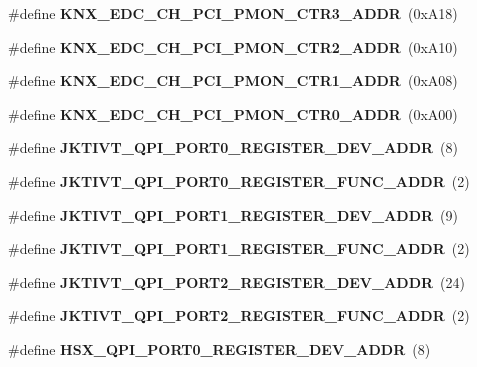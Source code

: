 \begin{DoxyCompactItemize}
\#define {\bfseries K\+N\+X\+\_\+\+E\+D\+C\+\_\+\+C\+H\+\_\+\+P\+C\+I\+\_\+\+P\+M\+O\+N\+\_\+\+C\+T\+R3\+\_\+\+A\+D\+DR}~(0x\+A18)
\item 
\mbox{\label{types_8h_aa71972834c6666ca420944d3566675de}} 
\#define {\bfseries K\+N\+X\+\_\+\+E\+D\+C\+\_\+\+C\+H\+\_\+\+P\+C\+I\+\_\+\+P\+M\+O\+N\+\_\+\+C\+T\+R2\+\_\+\+A\+D\+DR}~(0x\+A10)
\item 
\mbox{\label{types_8h_a239566edc85d69f4727b64f5b9dd4bec}} 
\#define {\bfseries K\+N\+X\+\_\+\+E\+D\+C\+\_\+\+C\+H\+\_\+\+P\+C\+I\+\_\+\+P\+M\+O\+N\+\_\+\+C\+T\+R1\+\_\+\+A\+D\+DR}~(0x\+A08)
\item 
\mbox{\label{types_8h_a6eb50ed6638e6c601a91757a67420da2}} 
\#define {\bfseries K\+N\+X\+\_\+\+E\+D\+C\+\_\+\+C\+H\+\_\+\+P\+C\+I\+\_\+\+P\+M\+O\+N\+\_\+\+C\+T\+R0\+\_\+\+A\+D\+DR}~(0x\+A00)
\item 
\mbox{\label{types_8h_a624a8b9595c387aae5603f38edf2e3fd}} 
\#define {\bfseries J\+K\+T\+I\+V\+T\+\_\+\+Q\+P\+I\+\_\+\+P\+O\+R\+T0\+\_\+\+R\+E\+G\+I\+S\+T\+E\+R\+\_\+\+D\+E\+V\+\_\+\+A\+D\+DR}~(8)
\item 
\mbox{\label{types_8h_ae7ea5cfb57b8685a1c7d448f47aade95}} 
\#define {\bfseries J\+K\+T\+I\+V\+T\+\_\+\+Q\+P\+I\+\_\+\+P\+O\+R\+T0\+\_\+\+R\+E\+G\+I\+S\+T\+E\+R\+\_\+\+F\+U\+N\+C\+\_\+\+A\+D\+DR}~(2)
\item 
\mbox{\label{types_8h_ae6e90624a2ad5e3a2296316203f12671}} 
\#define {\bfseries J\+K\+T\+I\+V\+T\+\_\+\+Q\+P\+I\+\_\+\+P\+O\+R\+T1\+\_\+\+R\+E\+G\+I\+S\+T\+E\+R\+\_\+\+D\+E\+V\+\_\+\+A\+D\+DR}~(9)
\item 
\mbox{\label{types_8h_a2a6e1278034cce4c46e0aa4c004fae91}} 
\#define {\bfseries J\+K\+T\+I\+V\+T\+\_\+\+Q\+P\+I\+\_\+\+P\+O\+R\+T1\+\_\+\+R\+E\+G\+I\+S\+T\+E\+R\+\_\+\+F\+U\+N\+C\+\_\+\+A\+D\+DR}~(2)
\item 
\mbox{\label{types_8h_a492f6579fb2b49601c727370b8706cc4}} 
\#define {\bfseries J\+K\+T\+I\+V\+T\+\_\+\+Q\+P\+I\+\_\+\+P\+O\+R\+T2\+\_\+\+R\+E\+G\+I\+S\+T\+E\+R\+\_\+\+D\+E\+V\+\_\+\+A\+D\+DR}~(24)
\item 
\mbox{\label{types_8h_a41efaa0371b8712857bb66a318bdfd12}} 
\#define {\bfseries J\+K\+T\+I\+V\+T\+\_\+\+Q\+P\+I\+\_\+\+P\+O\+R\+T2\+\_\+\+R\+E\+G\+I\+S\+T\+E\+R\+\_\+\+F\+U\+N\+C\+\_\+\+A\+D\+DR}~(2)
\item 
\mbox{\label{types_8h_a95b6d31ca6901dc2dee96ded36d1d177}} 
\#define {\bfseries H\+S\+X\+\_\+\+Q\+P\+I\+\_\+\+P\+O\+R\+T0\+\_\+\+R\+E\+G\+I\+S\+T\+E\+R\+\_\+\+D\+E\+V\+\_\+\+A\+D\+DR}~(8)
\item 
\mbox{\label{types_8h_ae40ffef6fe93a4028275f69a769c38cb}} 

\end{DoxyCompactItemize}
